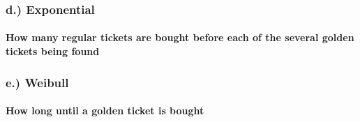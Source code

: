 \documentclass[]{article}
\let\oldparagraph\paragraph
\renewcommand{\paragraph}[1]{\oldparagraph{#1}\mbox{}}
\begin{document}
\subsubsection{d.) Exponential}\label{d.-exponential}

\paragraph{How many regular tickets are bought before each of the
several golden tickets being
found}\label{how-many-regular-tickets-are-bought-before-each-of-the-several-golden-tickets-being-found}

\subsubsection{e.) Weibull}\label{e.-weibull}

\paragraph{How long until a golden ticket is
bought}\label{how-long-until-a-golden-ticket-is-bought}
\end{document}
